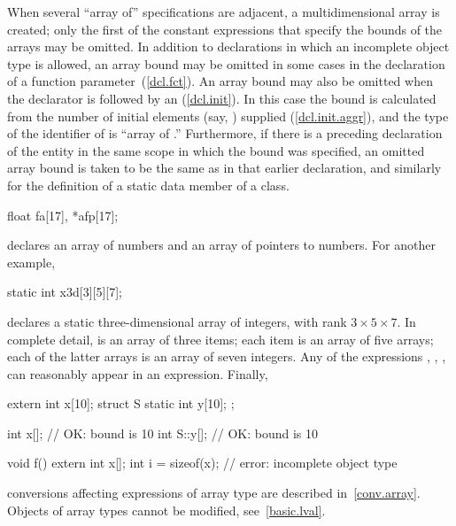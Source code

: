 \pnum
When several ``array of'' specifications are adjacent, a multidimensional
array is created;
only the first of
the constant expressions that specify the bounds
of the arrays may be omitted.
In addition to declarations in which an incomplete object type is allowed,
an array bound may be omitted in some cases in the declaration of a function
parameter~(\ref{dcl.fct}).
An array bound may
also be omitted
when the declarator is followed by an
(\ref{dcl.init}).
In this case the bound is calculated from the number
%
of initial elements (say,
)
supplied
(\ref{dcl.init.aggr}), and the type of the identifier of
is ``array of
.''
Furthermore, if there is a preceding declaration of the entity in the same
scope in which the bound was specified, an omitted array bound is taken to
be the same as in that earlier declaration, and similarly for the definition
of a static data member of a class.

\pnum
\enterexample
{}%
%
\begin{codeblock}
float fa[17], *afp[17];
\end{codeblock}

declares an array of
numbers and an array of
pointers to
numbers.
%
For another example,

\begin{codeblock}
static int x3d[3][5][7];
\end{codeblock}

declares a static three-dimensional array of integers,
with rank $3 \times 5 \times 7$.
In complete detail,
is an array of three items;
each item is an array of five arrays;
each of the latter arrays is an array of seven
integers.
Any of the expressions
,
,
,
can reasonably appear in an expression. Finally,
\begin{codeblock}
extern int x[10];
struct S {
  static int y[10];
};

int x[];                      // OK: bound is 10
int S::y[];                   // OK: bound is 10

void f() {
  extern int x[];
  int i = sizeof(x);          // error: incomplete object type
}
\end{codeblock}
\exitexample

\pnum
\enternote
conversions affecting expressions of array type are described in~\ref{conv.array}.
Objects of array types cannot be modified, see~\ref{basic.lval}.
\exitnote

